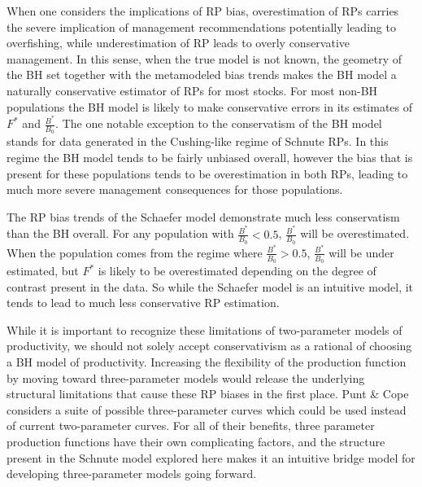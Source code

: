 {%
When one considers the implications of RP bias, overestimation of RPs carries
the severe implication of management recommendations potentially leading to
overfishing, while underestimation of RP leads to overly conservative management.
In this sense, when the true model is not known, the geometry of the BH set together
with the metamodeled bias trends makes the BH model a naturally conservative
estimator of RPs for most stocks. For most non-BH populations the BH model is
likely to make conservative errors in its estimates of $F^*$ and $\frac{B^*}{B_0}$.
The one notable exception to the conservatism of the BH model stands for data
generated in the Cushing-like regime of Schnute RPs. In this regime the BH
model tends to be fairly unbiased overall, however the bias that is present
for these populations tends to be overestimation in both RPs, leading to much
more severe management consequences for those populations.

%
The RP bias trends of the Schaefer model demonstrate much less {\color{red}conservatism} than the BH overall.
For any population with $\frac{B^*}{B_0}<0.5$, $\frac{B^*}{B_0}$ will be overestimated.
When the population comes from the regime where $\frac{B^*}{B_0}>0.5$, $\frac{B^*}{B_0}$
will be under estimated, but $F^*$ is likely to be overestimated depending on the degree of
contrast present in the data. So while the Schaefer model is an intuitive model, it tends to
lead to much less conservative RP estimation.

%
While it is important to recognize these limitations of two-parameter models
of productivity, we should not solely accept conservativism as a rational of
choosing a BH model of productivity. %
Increasing the flexibility of the production function by moving toward
three-parameter models would release the underlying structural limitations
\cite{mangel_perspective_2013} that cause these RP biases in the first place.
Punt \& Cope \cite{punt_extending_2019} %
considers a suite of possible three-parameter curves which could be used
instead of current two-parameter curves. For all of their benefits, three
parameter production functions have their own complicating factors, and the
structure present in the Schnute model explored here makes it an intuitive bridge
model for developing three-parameter models going forward.

}





